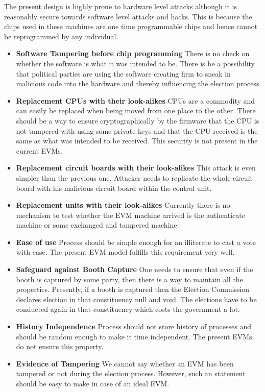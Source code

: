 \documentclass[11pt]{article}
\begin{document}
    The present design is highly prone to hardware level attacks although it is reasonably secure towards software level attacks and hacks. This is because the chips used in these machines are one time programmable chips and hence cannot be reprogrammed by any individual.
    \begin{itemize}
    \item \textbf{Software Tampering before chip programming} There is no check on whether the software is what it was intended to be. There is be a possibility that political parties are using the software creating firm to sneak in malicious code into the hardware and thereby influencing the election process.
    \item \textbf{Replacement CPUs with their look-alikes} CPUs are a commodity and can easily be replaced when being moved from one place to the other. There should be a way to ensure cryptographically by the firmware that the CPU is not tampered with using some private keys and that the CPU received is the same as what was intended to be received. This security is not present in the current EVMs.
    \item \textbf{Replacement circuit boards with their look-alikes} This attack is even simpler than the previous one. Attacker needs to replicate the whole circuit board with his malicious circuit board within the control unit.
    \item \textbf{Replacement units with their look-alikes} Currently there is no mechanism to test whether the EVM machine arrived is the authenticate machine or some exchanged and tampered machine.
    \item \textbf{Ease of use} Process should be simple enough for an illiterate to cast a vote with ease. The present EVM model fulfills this requirement very well.
    \item \textbf{Safeguard against Booth Capture} One needs to ensure that even if the booth is captured by some party, then there is a way to maintain all the properties. Presently, if a booth is captured then the Election Commission declares election in that constituency null and void. The elections have to be conducted again in that constituency which costs the government a lot.
    \item \textbf{History Independence} Process should not store history of processes and should be random enough to make it time independent. The present EVMs do not ensure this property.
    \item \textbf{Evidence of Tampering} We cannot say whether an EVM has been tampered or not during the election process. However, such an statement should be easy to make in case of an ideal EVM.
    \end{itemize}
    
\end{document}
